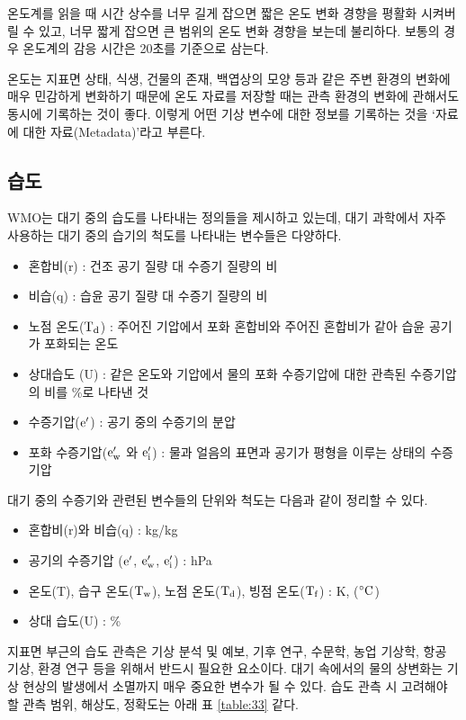 \begin{itemize}
{온도계를 읽을 때 시간 상수를 너무 길게 잡으면 짧은 온도 변화 경향을 평활화 시켜버릴 수 있고, 너무 짧게 잡으면 큰 범위의 온도 변화 경향을 보는데 불리하다. 보통의 경우 온도계의 감응 시간은 20초를 기준으로 삼는다. 

온도는 지표면 상태, 식생, 건물의 존재, 백엽상의 모양 등과 같은 주변 환경의 변화에 매우 민감하게 변화하기 때문에 온도 자료를 저장할 때는 관측 환경의 변화에 관해서도 동시에 기록하는 것이 좋다. 이렇게 어떤 기상 변수에 대한 정보를 기록하는 것을 ‘자료에 대한 자료(Metadata)’라고 부른다.

\subsection{습도}

WMO는 대기 중의 습도를 나타내는 정의들을 제시하고 있는데, 대기 과학에서 자주 사용하는 대기 중의 습기의 척도를 나타내는 변수들은 다양하다.

\begin{itemize}
	\item 혼합비(r) : 건조 공기 질량 대 수증기 질량의 비
	\item 비습(q) : 습윤 공기 질량 대 수증기 질량의 비
	\item 노점 온도($\rm T_d$) : 주어진 기압에서 포화 혼합비와 주어진 혼합비가 같아 습윤 공기가 포화되는 온도
	\item 상대습도 (U) : 같은 온도와 기압에서 물의 포화 수증기압에 대한 관측된 수증기압의 비를 \%로 나타낸 것
	\item 수증기압($\rm e^{\prime}$) : 공기 중의 수증기의 분압
	\item 포화 수증기압($\rm e_w^{\prime}$ 와 $\rm e_i^{\prime}$) : 물과 얼음의 표면과 공기가 평형을 이루는 상태의 수증기압
\end{itemize}
대기 중의 수증기와 관련된 변수들의 단위와 척도는 다음과 같이 정리할 수 있다.
\begin{itemize}
	\item 혼합비(r)와 비습(q) : kg/kg
	\item 공기의 수증기압 ($\rm e ^{\prime}$, $\rm e_w^{\prime}$, $\rm e_i^{\prime}$) : hPa
	\item 온도(T), 습구 온도($\rm T_w$), 노점 온도($\rm T_d$), 빙점 온도($\rm T_f$) : K, ($\rm ^{\circ}C$) 
	\item 상대 습도(U) : \%
\end{itemize}

지표면 부근의 습도 관측은 기상 분석 및 예보, 기후 연구, 수문학, 농업 기상학, 항공 기상, 환경 연구 등을 위해서 반드시 필요한 요소이다. 대기 속에서의 물의 상변화는 기상 현상의 발생에서 소멸까지 매우 중요한 변수가 될 수 있다. 
습도 관측 시 고려해야 할 관측 범위, 해상도, 정확도는 아래 표 \ref{table:33} \과 같다.

}
\end{itemize}
